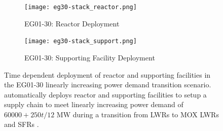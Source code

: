     \begin{figure}[]
        \centering
        \begin{subfigure}[t]{\textwidth}
            \centering
            \texttt{[image: eg30-stack\_reactor.png]} 
            \caption{EG01-30: Reactor Deployment}
            \label{fig:30reactor}
        \end{subfigure}
        \vspace{1cm}
        \begin{subfigure}[t]{\textwidth}
            \centering
            \texttt{[image: eg30-stack\_support.png]} 
            \caption{EG01-30: Supporting Facility Deployment}
            \label{fig:30support}
        \end{subfigure}
        \hfill
        \caption{Time dependent deployment of reactor and supporting facilities in 
        the EG01-30 linearly increasing power demand transition scenario. 
        \deploy automatically deploys reactor and supporting facilities 
        to setup a supply chain to meet linearly increasing power demand of $60000 + 250t/12$ MW
        during a transition from \glspl{LWR} to MOX LWRs and \glspl{SFR} \cite{chee_arfc/transition-scenarios_2018}. }
        \label{fig:30stack}
    \end{figure}
